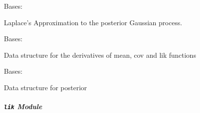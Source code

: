 \documentclass[letterpaper,10pt,english]{sphinxmanual}
\begin{document}

\begin{fulllineitems}
\label{pyGPs.Core:pyGPs.Core.inf.Laplace}
Bases: {\hyperref[pyGPs.Core:pyGPs.Core.inf.Inference]{}}

Laplace's Approximation to the posterior Gaussian process.

\begin{fulllineitems}
\label{pyGPs.Core:pyGPs.Core.inf.Laplace.proceed}
\end{fulllineitems}


\end{fulllineitems}


\begin{fulllineitems}
\label{pyGPs.Core:pyGPs.Core.inf.dnlZStruct}
Bases: 

Data structure for the derivatives of mean, cov and lik functions

\end{fulllineitems}


\begin{fulllineitems}
\label{pyGPs.Core:pyGPs.Core.inf.postStruct}
Bases: 

Data structure for posterior

\end{fulllineitems}



\subparagraph{\texttt{lik} Module}
\label{pyGPs.Core:module-pyGPs.Core.lik}\label{pyGPs.Core:lik-module}
\end{document}

